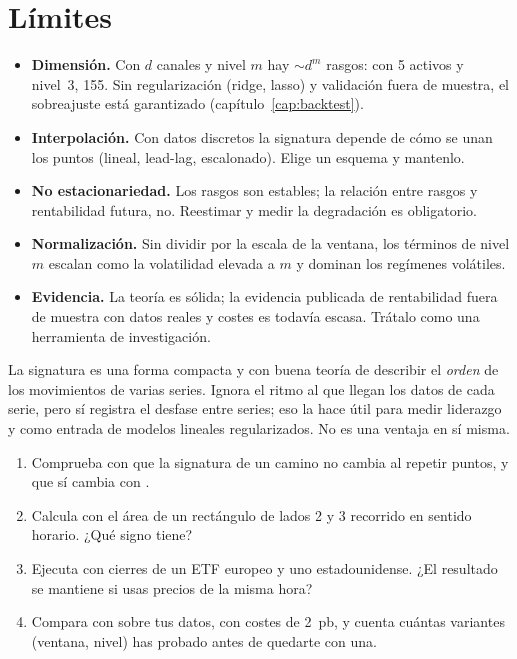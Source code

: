 \section{Límites}
\begin{itemize}
\item \textbf{Dimensión.} Con $d$ canales y nivel $m$ hay $\sim d^m$ rasgos: con 5 activos y nivel~3,
  155. Sin regularización (ridge, lasso) y validación fuera de muestra, el sobreajuste está
  garantizado (capítulo~\ref{cap:backtest}).
\item \textbf{Interpolación.} Con datos discretos la signatura depende de cómo se unan los puntos
  (lineal, lead-lag, escalonado). Elige un esquema y mantenlo.
\item \textbf{No estacionariedad.} Los rasgos son estables; la relación entre rasgos y rentabilidad
  futura, no. Reestimar y medir la degradación es obligatorio.
\item \textbf{Normalización.} Sin dividir por la escala de la ventana, los términos de nivel $m$ escalan
  como la volatilidad elevada a $m$ y dominan los regímenes volátiles.
\item \textbf{Evidencia.} La teoría es sólida; la evidencia publicada de rentabilidad fuera de muestra
  con datos reales y costes es todavía escasa. Trátalo como una herramienta de investigación.
\end{itemize}

\begin{clave}
La signatura es una forma compacta y con buena teoría de describir el \emph{orden} de los movimientos
de varias series. Ignora el ritmo al que llegan los datos de cada serie, pero sí registra el desfase
entre series; eso la hace útil para medir liderazgo y como entrada de modelos lineales regularizados.
No es una ventaja en sí misma.
\end{clave}

\begin{ejercicios}
\begin{enumerate}
\item Comprueba con  que la signatura de un camino no cambia al repetir puntos,
  y que sí cambia con .
\item Calcula con  el área de un rectángulo de lados 2 y 3 recorrido en
  sentido horario. ¿Qué signo tiene?
\item Ejecuta  con cierres de un ETF europeo y uno estadounidense. ¿El
  resultado se mantiene si usas precios de la misma hora?
\item Compara  con  sobre tus datos, con costes de
  2~pb, y cuenta cuántas variantes (ventana, nivel) has probado antes de quedarte con una.
\end{enumerate}
\end{ejercicios}
